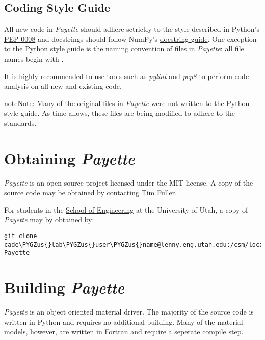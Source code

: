\documentclass[letterpaper,10pt,english]{sphinxmanual}
\def\PYGZus{\char`\_}
\begin{document}
\section{Coding Style Guide}
\label{Files/layout:coding-style-guide}
All new code in \emph{Payette} should adhere sctrictly to the style described in
Python's \href{http://www.python.org/dev/peps/pep-0008/}{PEP-0008} and docstrings
should follow NumPy's \href{https://github.com/numpy/numpy/blob/master/doc/HOWTO\_DOCUMENT.rst.txt}{docstring guide}. One
exception to the Python style guide is the naming convention of files in
\emph{Payette}: all file names begin with .

It is highly recommended to use tools such as \emph{pylint} and \emph{pep8} to perform
code analysis on all new and existing code.

\begin{notice}{note}{Note:}
Many of the original files in \emph{Payette} were not written to the
Python style guide. As time allows, these files are being modified to
adhere to the standards.
\end{notice}


\chapter{Obtaining \emph{Payette}}
\label{Files/obtaining:obtaining-payette}\label{Files/obtaining::doc}
\emph{Payette} is an open source project licensed under the MIT license. A copy of
the source code may be obtained by contacting \href{mailto:tjfulle@sandia.gov}{Tim Fuller}.

For students in the \href{http://www.coe.utah.edu}{School of Engineering} at the
University of Utah, a copy of \emph{Payette} may by obtained by:

\begin{Verbatim}[commandchars=\\\{\}]
git clone cade\PYGZus{}lab\PYGZus{}user\PYGZus{}name@lenny.eng.utah.edu:/csm/local/git/Payette.git Payette
\end{Verbatim}


\chapter{Building \emph{Payette}}
\label{Files/building:building-payette}\label{Files/building::doc}
\emph{Payette} is an object oriented material driver. The majority of the source code
is written in Python and requires no additional building. Many of the material
models, however, are written in Fortran and require a seperate compile step.
\end{document}
